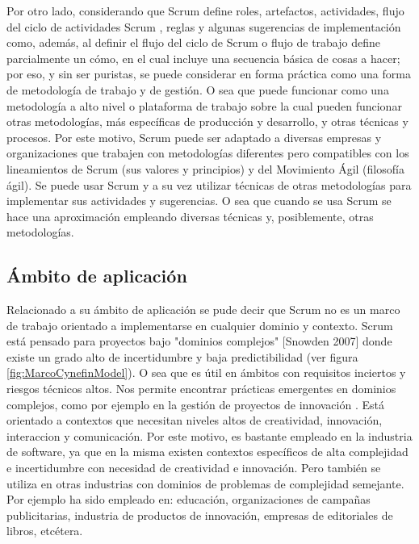 Por otro lado, considerando que Scrum define roles, artefactos, actividades, flujo del ciclo de actividades Scrum \cite{Agile-Atlas-2012}, reglas y algunas sugerencias de implementación como, además, al definir el flujo del ciclo de Scrum o flujo de trabajo define parcialmente un cómo, en el cual incluye una secuencia básica de cosas a hacer; por eso, y sin ser puristas, se puede considerar en forma práctica como una forma de metodología de trabajo y de gestión. O sea que puede funcionar como una metodología a alto nivel o plataforma de trabajo sobre la cual pueden funcionar otras metodologías, más específicas de producción y desarrollo, y otras técnicas y procesos. Por este motivo, 
Scrum puede ser adaptado a diversas empresas y organizaciones que trabajen con metodologías diferentes pero compatibles con los 
lineamientos de Scrum (sus valores y principios) y del Movimiento Ágil (filosofía ágil). Se puede usar Scrum y a su vez utilizar técnicas de otras metodologías para implementar sus actividades y sugerencias. O sea que cuando se usa Scrum se hace una aproximación empleando diversas técnicas y, posiblemente, otras metodologías.

\subsection{Ámbito de aplicación}

Relacionado a su ámbito de aplicación se pude decir que Scrum no es un marco de trabajo orientado a implementarse en cualquier dominio y contexto. Scrum está pensado para proyectos bajo "dominios complejos" [Snowden 2007] donde existe un grado alto de incertidumbre y baja predictibilidad (ver figura \ref{fig:MarcoCynefinModel}). O sea que es útil en ámbitos con requisitos inciertos y riesgos técnicos altos. Nos permite encontrar prácticas emergentes en dominios complejos, como por ejemplo en la gestión de proyectos de innovación \cite{Martin-Alaimo-2014}. Está orientado a contextos que necesitan niveles altos de creatividad, innovación, interaccion y comunicación. Por este motivo, es bastante empleado en la industria de software, ya que en la misma existen contextos específicos de alta complejidad e incertidumbre con necesidad de creatividad e innovación. Pero también se utiliza en otras industrias con dominios de problemas de complejidad semejante. Por ejemplo ha sido empleado en: educación, organizaciones de campañas publicitarias, industria de productos de innovación, empresas de editoriales de libros, etcétera.


